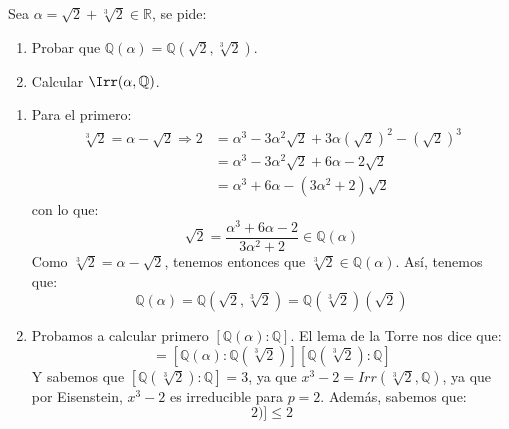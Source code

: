 \begin{ejercicio}
    Sea $\alpha = \sqrt{2}+\sqrt[3]{2}\in \mathbb{R}$, se pide:
    \begin{enumerate}[label=\alph*)]
        \item Probar que $\mathbb{Q}(\alpha) = \mathbb{Q}(\sqrt{2},\sqrt[3]{2})$.
        \item Calcular $\Irr(\alpha,\mathbb{Q})$.
    \end{enumerate}
    \begin{enumerate}[label=\alph*)]
        \item Para el primero:
            \begin{align*}
                \sqrt[3]{2} = \alpha - \sqrt{2} \Longrightarrow 2&=\alpha^3 - 3\alpha^2\sqrt{2} + 3\alpha{(\sqrt{2})}^{2} - {(\sqrt{2})}^{3} \\
                                                &=\alpha^3 - 3\alpha^2\sqrt{2}+6\alpha - 2\sqrt{2} \\
                                                &=\alpha^3 + 6\alpha-(3\alpha^2 +2)\sqrt{2}
            \end{align*}
            con lo que:
            \begin{equation*}
                \sqrt{2} = \dfrac{\alpha^3 + 6\alpha - 2}{3\alpha^2 + 2}\in \mathbb{Q}(\alpha)
            \end{equation*}
            Como $\sqrt[3]{2} = \alpha-\sqrt{2}$, tenemos entonces que $\sqrt[3]{2}\in \mathbb{Q}(\alpha)$. Así, tenemos que:
            \begin{equation*}
                \mathbb{Q}(\alpha) = \mathbb{Q}(\sqrt{2},\sqrt[3]{2}) = \mathbb{Q}(\sqrt[3]{2})(\sqrt{2})
            \end{equation*}
        \item Probamos a calcular primero $[\mathbb{Q}(\alpha):\mathbb{Q}]$. El lema de la Torre nos dice que:
            \begin{equation*}
                [\mathbb{Q}(\alpha):\mathbb{Q}] = [\mathbb{Q}(\alpha):\mathbb{Q}(\sqrt[3]{2})][\mathbb{Q}(\sqrt[3]{2}):\mathbb{Q}]
            \end{equation*}
            Y sabemos que $[\mathbb{Q}(\sqrt[3]{2}):\mathbb{Q}] =3$, ya que $x^3-2=Irr(\sqrt[3]{2},\mathbb{Q})$, ya que por Eisenstein, $x^3-2$ es irreducible para $p=2$. Además, sabemos que:
            \begin{equation*}
                [\mathbb{Q}(\alpha):\mathbb{Q}(\sqrt[3]{2})] \leq 2
            \end{equation*}

\end{enumerate}
\end{ejercicio}

